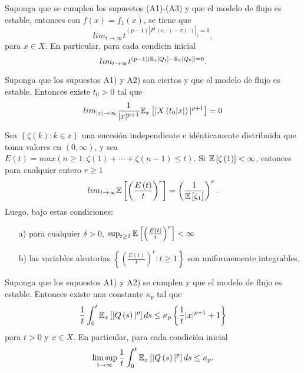 \begin{Teo}\label{Tma.6.3}
Suponga que se cumplen los supuestos (A1)-(A3) y que el modelo de
flujo es estable, entonces con
$f\left(x\right)=f_{1}\left(x\right)$, se tiene que
\[lim_{t\rightarrow\infty}t^{(p-1)\left|P^{t}\left(c,\cdot\right)-\pi\left(\cdot\right)\right|_{f}=0},\]
para $x\in X$. En particular, para cada condicin inicial
\[lim_{t\rightarrow\infty}t^{(p-1)\left|\mathbb{E}_{x}\left[Q_{t}\right]-\mathbb{E}_{\pi}\left[Q_{0}\right]\right|=0}.\]
\end{Teo}



\begin{Prop}\label{Prop.5.1.DaiSean}
Suponga que los supuestos A1) y A2) son ciertos y que el modelo de flujo es estable. Entonces existe $t_{0}>0$ tal que
\begin{equation}
lim_{|x|\rightarrow\infty}\frac{1}{|x|^{p+1}}\mathbb{E}_{x}\left[|X\left(t_{0}|x|\right)|^{p+1}\right]=0
\end{equation}
\end{Prop}

\begin{Lemma}\label{Lema.5.2.DaiSean}
 Sea $\left\{\zeta\left(k\right):k\in \mathbb{z}\right\}$ una sucesi\'on independiente e id\'enticamente distribuida que toma valores en $\left(0,\infty\right)$,
y sea
$E\left(t\right)=max\left(n\geq1:\zeta\left(1\right)+\cdots+\zeta\left(n-1\right)\leq
t\right)$. Si $\mathbb{E}\left[\zeta\left(1\right)\right]<\infty$,
entonces para cualquier entero $r\geq1$
\begin{equation}
 lim_{t\rightarrow\infty}\mathbb{E}\left[\left(\frac{E\left(t\right)}{t}\right)^{r}\right]=\left(\frac{1}{\mathbb{E}\left[\zeta_{1}\right]}\right)^{r}.
\end{equation}
Luego, bajo estas condiciones:
\begin{itemize}
 \item[a)] para cualquier $\delta>0$, $\sup_{t\geq\delta}\mathbb{E}\left[\left(\frac{E\left(t\right)}{t}\right)^{r}\right]<\infty$
\item[b)] las variables aleatorias
$\left\{\left(\frac{E\left(t\right)}{t}\right)^{r}:t\geq1\right\}$
son uniformemente integrables.
\end{itemize}
\end{Lemma}

\begin{Teo}\label{Tma.5.5.DaiSean}
Suponga que los supuestos A1) y A2) se cumplen y que el modelo de
flujo es estable. Entonces existe una constante $\kappa_{p}$ tal
que
\begin{equation}
\frac{1}{t}\int_{0}^{t}\mathbb{E}_{x}\left[|Q\left(s\right)|^{p}\right]ds\leq\kappa_{p}\left\{\frac{1}{t}|x|^{p+1}+1\right\}
\end{equation}
para $t>0$ y $x\in X$. En particular, para cada condici\'on
inicial
\begin{eqnarray*}
\limsup_{t\rightarrow\infty}\frac{1}{t}\int_{0}^{t}\mathbb{E}_{x}\left[|Q\left(s\right)|^{p}\right]ds\leq\kappa_{p}.
\end{eqnarray*}
\end{Teo}

